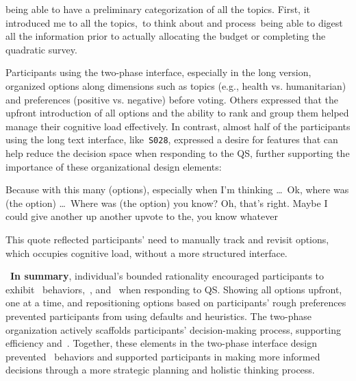 \begin{displayquote}
\bracketellipsis being able to have a preliminary categorization of all the topics. First, it introduced me to all the topics,~\bracketellipsis to think about and process~\bracketellipsis being able to digest all the information prior to actually allocating the budget or completing the quadratic survey. \hfill{}
\end{displayquote}

Participants using the two-phase interface, especially in the long version, organized options along dimensions such as topics (e.g., health vs. humanitarian) and preferences (positive vs. negative) before voting. Others expressed that the upfront introduction of all options and the ability to rank and group them helped manage their cognitive load effectively. In contrast, almost half of the participants using the long text interface, like~\texttt{S028}, expressed a desire for features that can help reduce the decision space when responding to the QS, further supporting the importance of these organizational design elements:

\begin{displayquote}
Because with this many (options), especially when I'm thinking \ldots\ Ok, where was (the option) \ldots\ Where was (the option) you know? Oh, that's right. Maybe I could give another up another upvote to the, you know whatever~\bracketellipsis \hfill{}
\end{displayquote}

This quote reflected participants' need to manually track and revisit options, which occupies cognitive load, without a more structured interface.

~\textbf{In summary}, individual's bounded rationality encouraged participants to exhibit~\textit{} behaviors,~\textit{}, and~\textit{} when responding to QS. Showing all options upfront, one at a time, and repositioning options based on participants' rough preferences prevented participants from using defaults and heuristics. The two-phase organization actively scaffolds participants' decision-making process, supporting efficiency \textit{} and~\textit{}. Together, these elements in the two-phase interface design prevented~\textit{} behaviors and supported participants in making more informed decisions through a more strategic planning and holistic thinking process.

